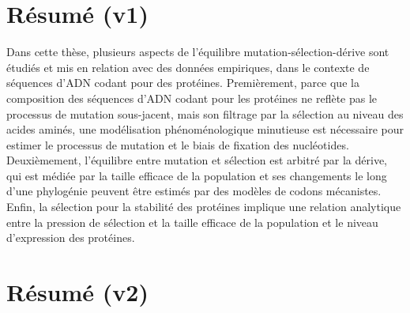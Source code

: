 \thispagestyle{empty}

\section*{Résumé (v1)}

Dans cette thèse, plusieurs aspects de l'équilibre mutation-sélection-dérive sont étudiés et mis en relation avec des données empiriques, dans le contexte de séquences d'ADN codant pour des protéines.
Premièrement, parce que la composition des séquences d'ADN codant pour les protéines ne reflète pas le processus de mutation sous-jacent, mais son filtrage par la sélection au niveau des acides aminés, une modélisation phénoménologique minutieuse est nécessaire pour estimer le processus de mutation et le biais de fixation des nucléotides.
Deuxièmement, l'équilibre entre mutation et sélection est arbitré par la dérive, qui est médiée par la taille efficace de la population et ses changements le long d'une phylogénie peuvent être estimés par des modèles de codons mécanistes.
Enfin, la sélection pour la stabilité des protéines implique une relation analytique entre la pression de sélection et la taille efficace de la population et le niveau d'expression des protéines.

\section*{Résumé (v2)}

